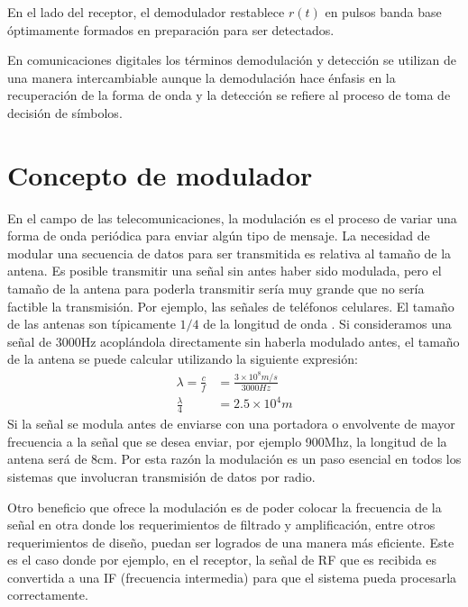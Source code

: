 En el lado del receptor, el demodulador restablece $r(t)$ en pulsos banda base
\'optimamente formados en preparaci\'on para ser detectados.

En comunicaciones digitales los t\'erminos demodulaci\'on y detecci\'on se utilizan de una manera intercambiable \cite{sklar}
aunque la demodulaci\'on hace \'enfasis en la recuperaci\'on de la forma de onda y la detecci\'on se refiere al proceso de toma de
decisi\'on de s\'imbolos.

\section{Concepto de modulador}

En el campo de las telecomunicaciones, la modulaci\'on es el proceso de variar
una forma de onda peri\'odica para enviar alg\'un tipo de mensaje\cite{sklar}. La necesidad
de modular una secuencia de datos para ser transmitida es relativa al tama\~no de
la antena. Es posible transmitir una se\~nal sin antes haber sido modulada, pero
el tama\~no de la antena para poderla transmitir ser\'ia muy grande que no
ser\'ia factible la transmisi\'on. Por ejemplo, las se\~nales de tel\'efonos
celulares. El tama\~no de las antenas son t\'ipicamente $1/4$ de la longitud de onda
\cite{sklar}. Si consideramos una se\~nal de 3000Hz acopl\'andola directamente
sin haberla modulado antes, el tama\~no de la antena se puede calcular
utilizando la siguiente expresi\'on:
\begin{equation}
\begin{aligned}
\lambda=\frac{c}{f}&=\frac{3\times10^8m/s}{3000Hz}\\
\frac{\lambda}{4}&=2.5\times10^4m
\end{aligned}
\end{equation}
Si la se\~nal se modula antes de enviarse con una portadora o envolvente de
mayor frecuencia a la se\~nal que se desea enviar, por ejemplo 900Mhz, la longitud de la antena ser\'a de 8cm. Por esta raz\'on
la modulaci\'on es un paso esencial en todos los sistemas que involucran transmisi\'on de datos por
radio.

Otro beneficio que ofrece la modulaci\'on es de poder colocar la frecuencia de la se\~nal en otra
donde los requerimientos de filtrado y amplificaci\'on, entre otros requerimientos de dise\~no,
puedan ser logrados de una manera m\'as eficiente. Este es el caso donde por ejemplo, en el receptor,
la se\~nal de RF que es recibida es convertida a una IF (frecuencia intermedia) para que el sistema
pueda procesarla correctamente.

